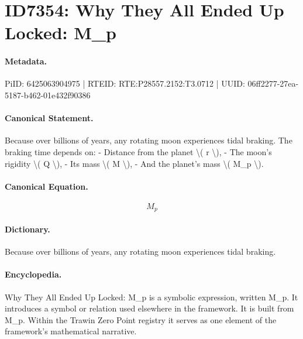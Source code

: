 \section*{ID7354: Why They All Ended Up Locked: M\_p}
\paragraph{Metadata.}
PiID: 6425063904975 | RTEID: RTE:P28557.2152:T3.0712 | UUID: 06ff2277-27ea-5187-b462-01e432f90386

\paragraph{Canonical Statement.}
Because over billions of years, any rotating moon experiences tidal braking. The braking time depends on: - Distance from the planet \textbackslash{}( r \textbackslash{}), - The moon’s rigidity \textbackslash{}( Q \textbackslash{}), - Its mass \textbackslash{}( M \textbackslash{}), - And the planet’s mass \textbackslash{}( M\_p \textbackslash{}).

\paragraph{Canonical Equation.}
\[
M_p
\]

\paragraph{Dictionary.}
Because over billions of years, any rotating moon experiences tidal braking.

\paragraph{Encyclopedia.}
Why They All Ended Up Locked: M\_p is a symbolic expression, written M\_p. It introduces a symbol or relation used elsewhere in the framework. It is built from M\_p. Within the Trawin Zero Point registry it serves as one element of the framework's mathematical narrative.
